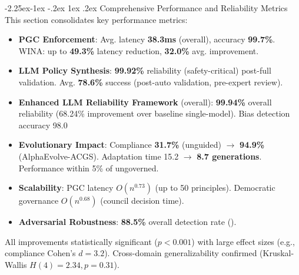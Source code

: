 \documentclass[manuscript,screen,9pt]{acmart}
\makeatletter
\renewcommand\subsection{\@startsection{subsection}{2}{\z@}%
  {-2.25ex\@plus -1ex \@minus -.2ex}%
  {1ex \@plus .2ex}%
  {\normalfont\large\bfseries}}
\makeatother
\begin{document}
\subsection{Comprehensive Performance and Reliability Metrics}
\label{subsec:comprehensive_performance_analysis} 
This section consolidates key performance metrics:
\begin{itemize}[leftmargin=*,itemsep=1pt,parsep=1pt]
    \item \textbf{PGC Enforcement}: Avg. latency \textbf{38.3ms} (overall), accuracy \textbf{99.7\%}. WINA: up to \textbf{49.3\%} latency reduction, \textbf{32.0\%} avg. improvement.
    \item \textbf{LLM Policy Synthesis}: \textbf{99.92\%} reliability (safety-critical) post-full validation. Avg. \textbf{78.6\%} success (post-auto validation, pre-expert review).
    \item \textbf{Enhanced LLM Reliability Framework} (overall): \textbf{99.94\%} overall reliability (68.24\% improvement over baseline single-model). Bias detection accuracy 98.0%
    \item \textbf{Evolutionary Impact}: Compliance \textbf{31.7\%} (unguided) $\rightarrow$ \textbf{94.9\%} (AlphaEvolve-ACGS). Adaptation time 15.2 $\rightarrow$ \textbf{8.7 generations}. Performance within 5\% of ungoverned.
    \item \textbf{Scalability}: PGC latency $O(n^{0.73})$ (up to 50 principles). Democratic governance $O(n^{0.68})$ (council decision time).
    \item \textbf{Adversarial Robustness}: \textbf{88.5\%} overall detection rate ().
\end{itemize}
All improvements statistically significant ($p < 0.001$) with large effect sizes (e.g., compliance Cohen's $d = 3.2$). Cross-domain generalizability confirmed (Kruskal-Wallis $H(4) = 2.34, p = 0.31$).
\end{document}
